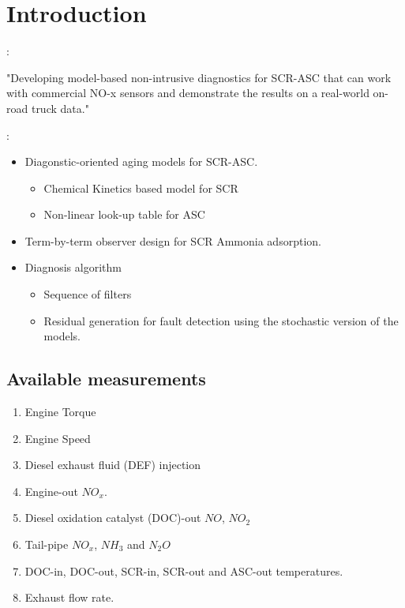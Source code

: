 \section{Introduction}

:

"Developing model-based non-intrusive diagnostics for SCR-ASC that can work with commercial NO-x sensors and demonstrate the results on a real-world on-road truck data."

\bigskip

:
\begin{itemize}
    \item Diagonstic-oriented aging models for SCR-ASC.
    \begin{itemize}
        \item Chemical Kinetics based model for SCR
        \item Non-linear look-up table for ASC
    \end{itemize}
    \item Term-by-term observer design for SCR Ammonia adsorption.
    \item Diagnosis algorithm
    \begin{itemize}
        \item Sequence of filters
        \item Residual generation for fault detection using the stochastic version of the models.
    \end{itemize}
\end{itemize}

\subsection{Available measurements}
\begin{enumerate}
    \item Engine Torque
    \item Engine Speed
    \item Diesel exhaust fluid (DEF) injection
    \item Engine-out $NO_x$.
    \item Diesel oxidation catalyst (DOC)-out $NO$, $NO_2$
    \item Tail-pipe $NO_x$, $NH_3$ and $N_2O$
    \item DOC-in, DOC-out, SCR-in, SCR-out and ASC-out temperatures.
    \item Exhaust flow rate.
\end{enumerate}


